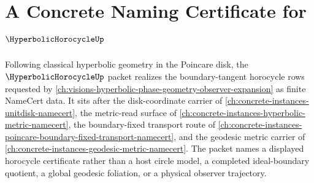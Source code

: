 \chapter{A Concrete Naming Certificate for $\HyperbolicHorocycleUp$}
\label{ch:concrete-instances-hyperbolic-horocycle-namecert}

Following classical hyperbolic geometry in the Poincare disk, the $\HyperbolicHorocycleUp$ packet realizes the boundary-tangent horocycle rows requested by \autoref{ch:visions-hyperbolic-phase-geometry-observer-expansion} as finite NameCert data. It sits after the disk-coordinate carrier of \autoref{ch:concrete-instances-unitdisk-namecert}, the metric-read surface of \autoref{ch:concrete-instances-hyperbolic-metric-namecert}, the boundary-fixed transport route of \autoref{ch:concrete-instances-poincare-boundary-fixed-transport-namecert}, and the geodesic metric carrier of \autoref{ch:concrete-instances-geodesic-metric-namecert}. The packet names a displayed horocycle certificate rather than a host circle model, a completed ideal-boundary quotient, a global geodesic foliation, or a physical observer trajectory.

